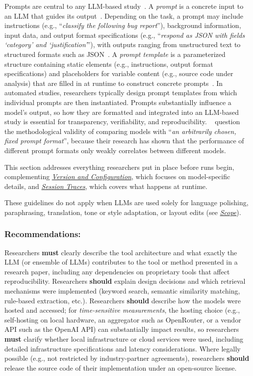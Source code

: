 \documentclass[smallextended]{svjour3}
\newcommand*{\enq}[1]{\enquote{{\itshape#1}}}
\newcommand{\must}{\textbf{must}\xspace}
\newcommand{\should}{\textbf{should}\xspace}
\newcommand{\scope}{\hyperref[sec:scope]{\emph{Scope}}\xspace}
\newcommand{\scope}{\href{/scope/}{\emph{Scope}}\xspace}
\newcommand{\modelversion}{\hyperref[sec:report-model-version-configuration-and-customizations]{\emph{Version and Configuration}}\xspace}
\newcommand{\traces}{\hyperref[sec:report-session-traces]{\emph{Session Traces}}\xspace}
\newcommand{\modelversion}{\href{/guidelines\#report-model-version-configuration-and-customizations}{\emph{Version and Configuration}}\xspace}
\newcommand{\traces}{\href{/guidelines\#report-session-traces}{\emph{Session Traces}}\xspace}
\newcommand{\guidelinesubsubsection}[1]{\subsubsection{\bfseries #1:}}
\newcommand{\guidelinesubsubsection}[1]{\subsubsection{#1}}
\begin{document}
Prompts are central to any LLM-based study~\cite{DBLP:conf/iclr/Sclar0TS24}.
A \emph{prompt} is a concrete input to an LLM that guides its output~\cite{DBLP:journals/corr/abs-2406-06608}.
Depending on the task, a prompt may include instructions (e.g., \enq{classify the following bug report}), background information, input data, and output format specifications (e.g., \enq{respond as JSON with fields `category' and `justification'}), with outputs ranging from unstructured text to structured formats such as JSON~\cite{promptingguide_elements}.
A \emph{prompt template} is a parameterized structure containing static elements (e.g., instructions, output format specifications) and placeholders for variable content (e.g., source code under analysis) that are filled in at runtime to construct concrete prompts~\cite{DBLP:journals/corr/abs-2406-06608}.
In automated studies, researchers typically design prompt templates from which individual prompts are then instantiated.
Prompts substantially influence a model's output, so how they are formatted and integrated into an LLM-based study is essential for transparency, verifiability, and reproducibility.
\citeauthor{DBLP:conf/iclr/Sclar0TS24}~\cite{DBLP:conf/iclr/Sclar0TS24} question the methodological validity of comparing models with \enq{an arbitrarily chosen, fixed prompt format}, because their research has shown that the performance of different prompt formats only weakly correlates between different models.

This section addresses everything researchers put in place before runs begin, complementing \modelversion, which focuses on model-specific details, and \traces, which covers what happens at runtime.

These guidelines do not apply when LLMs are used solely for language polishing, paraphrasing, translation, tone or style adaptation, or layout edits (see \scope).

\guidelinesubsubsection{Recommendations}

Researchers \must clearly describe the tool architecture and what exactly the LLM (or ensemble of LLMs) contributes to the tool or method presented in a research paper, including any dependencies on proprietary tools that affect reproducibility.
Researchers \should explain design decisions and which retrieval mechanisms were implemented (keyword search, semantic similarity matching, rule-based extraction, etc.).
Researchers \should describe how the models were hosted and accessed; for \emph{time-sensitive measurements}, the hosting choice (e.g., self-hosting on local hardware, an aggregator such as OpenRouter, or a vendor API such as the OpenAI API) can substantially impact results, so researchers \must clarify whether local infrastructure or cloud services were used, including detailed infrastructure specifications and latency considerations.
Where legally possible (e.g., not restricted by industry-partner agreements), researchers \should release the source code of their implementation under an open-source license.
\end{document}
